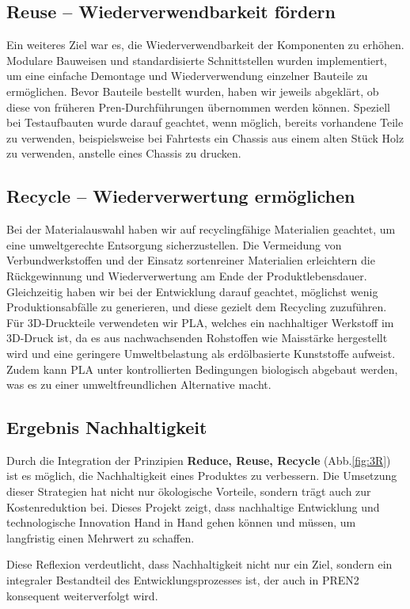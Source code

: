 \documentclass[../main.tex]{subfiles}
\begin{document}
\subsection{Reuse – Wiederverwendbarkeit fördern}

Ein weiteres Ziel war es, die Wiederverwendbarkeit der Komponenten zu erhöhen. Modulare Bauweisen und standardisierte Schnittstellen wurden implementiert, um eine einfache Demontage und Wiederverwendung einzelner Bauteile zu ermöglichen. Bevor Bauteile bestellt wurden, haben wir jeweils abgeklärt, ob diese von früheren Pren-Durchführungen übernommen werden können. Speziell bei Testaufbauten wurde darauf geachtet, wenn möglich, bereits vorhandene Teile zu verwenden, beispielsweise bei Fahrtests ein Chassis aus einem alten Stück Holz zu verwenden, anstelle eines Chassis zu drucken.

\subsection{Recycle – Wiederverwertung ermöglichen}

Bei der Materialauswahl haben wir auf recyclingfähige Materialien geachtet, um eine umweltgerechte Entsorgung sicherzustellen. Die Vermeidung von Verbundwerkstoffen und der Einsatz sortenreiner Materialien erleichtern die Rückgewinnung und Wiederverwertung am Ende der Produktlebensdauer. Gleichzeitig haben wir bei der Entwicklung darauf geachtet, möglichst wenig Produktionsabfälle zu generieren, und diese gezielt dem Recycling zuzuführen. Für 3D-Druckteile verwendeten wir PLA, welches ein nachhaltiger Werkstoff im 3D-Druck ist, da es aus nachwachsenden Rohstoffen wie Maisstärke hergestellt wird und eine geringere Umweltbelastung als erdölbasierte Kunststoffe aufweist. Zudem kann PLA unter kontrollierten Bedingungen biologisch abgebaut werden, was es zu einer umweltfreundlichen Alternative macht.

\subsection{Ergebnis Nachhaltigkeit}

Durch die Integration der Prinzipien \textbf{Reduce, Reuse, Recycle} (Abb.\ref{fig:3R}) ist es möglich, die Nachhaltigkeit eines Produktes zu verbessern. Die Umsetzung dieser Strategien hat nicht nur ökologische Vorteile, sondern trägt auch zur Kostenreduktion bei. Dieses Projekt zeigt, dass nachhaltige Entwicklung und technologische Innovation Hand in Hand gehen können und müssen, um langfristig einen Mehrwert zu schaffen.

Diese Reflexion verdeutlicht, dass Nachhaltigkeit nicht nur ein Ziel, sondern ein integraler Bestandteil des Entwicklungsprozesses ist, der auch in PREN2 konsequent weiterverfolgt wird.
\end{document}
